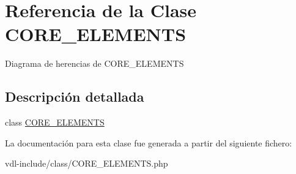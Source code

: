 \hypertarget{class_c_o_r_e___e_l_e_m_e_n_t_s}{\section{Referencia de la Clase C\-O\-R\-E\-\_\-\-E\-L\-E\-M\-E\-N\-T\-S}
\label{class_c_o_r_e___e_l_e_m_e_n_t_s}
}


Diagrama de herencias de C\-O\-R\-E\-\_\-\-E\-L\-E\-M\-E\-N\-T\-S


\subsection{Descripción detallada}
class \hyperlink{class_c_o_r_e___e_l_e_m_e_n_t_s}{C\-O\-R\-E\-\_\-\-E\-L\-E\-M\-E\-N\-T\-S} 

La documentación para esta clase fue generada a partir del siguiente fichero\-:\begin{DoxyCompactItemize}
\item 
vdl-\/include/class/C\-O\-R\-E\-\_\-\-E\-L\-E\-M\-E\-N\-T\-S.\-php\end{DoxyCompactItemize}
